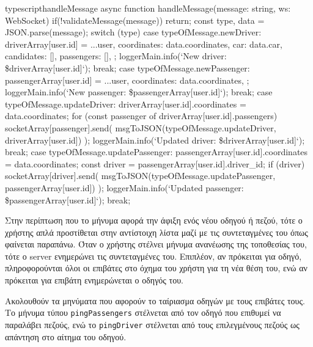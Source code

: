 \documentclass[../thesis.tex]{subfiles}
\begin{document}
\begin{codeblock}{typescript}{handleMessage}
  async function handleMessage(message: string, ws: WebSocket) {
    if(!validateMessage(message)) return;
    const { type, data } = JSON.parse(message);
    switch (type) {
      case typeOfMessage.newDriver: {
        driverArray[user.id] = {
          ...user,
          coordinates: data.coordinates,
          car: data.car,
          candidates: [],
          passengers: [],
        };
        loggerMain.info(`New driver: \${driverArray[user.id]}`);
        break;
      }
      case typeOfMessage.newPassenger: {
        passengerArray[user.id] = {
          ...user,
          coordinates: data.coordinates,
        };
        loggerMain.info(`New passenger: \${passengerArray[user.id]}`);
        break;
      }
    }
    case typeOfMessage.updateDriver: {
      driverArray[user.id].coordinates = data.coordinates;
      for (const passenger of driverArray[user.id].passengers) {
        socketArray[passenger].send(
          msgToJSON(typeOfMessage.updateDriver, driverArray[user.id])
        );
      }
      loggerMain.info(`Updated driver: \${driverArray[user.id]}`);
      break;
    }
    case typeOfMessage.updatePassenger: {
      passengerArray[user.id].coordinates = data.coordinates;
      const driver = passengerArray[user.id].driver_id;
      if (driver) {
        socketArray[driver].send(
          msgToJSON(typeOfMessage.updatePassenger, passengerArray[user.id])
        );
      }
      loggerMain.info(`Updated passenger: \${passengerArray[user.id]}`);
      break;
    }
  }
\end{codeblock}

Στην περίπτωση που το μήνυμα αφορά την άφιξη ενός νέου οδηγού ή πεζού, τότε ο χρήστης απλά προστίθεται στην αντίστοιχη λίστα μαζί με τις συντεταγμένες του όπως φαίνεται παραπάνω.
Όταν ο χρήστης στέλνει μήνυμα ανανέωσης της τοποθεσίας του, τότε ο server ενημερώνει τις συντεταγμένες του. Επιπλέον, αν πρόκειται για οδηγό, πληροφορούνται όλοι οι επιβάτες στο όχημα του χρήστη για τη νέα θέση του, ενώ αν πρόκειται για επιβάτη ενημερώνεται ο οδηγός του.

Ακολουθούν τα μηνύματα που αφορούν το ταίριασμα οδηγών με τους επιβάτες τους.
Το μήνυμα τύπου \verb|pingPassengers| στέλνεται από τον οδηγό που επιθυμεί να παραλάβει πεζούς, ενώ το \verb|pingDriver| στέλνεται από τους επιλεγμένους πεζούς ως απάντηση στο αίτημα του οδηγού.
\end{document}
